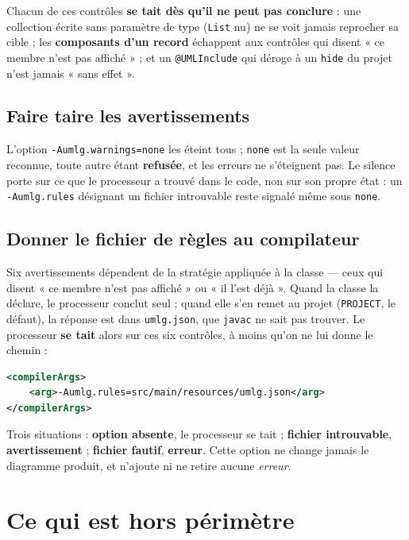 \documentclass[12pt, a4paper]{article}
\begin{document}
Chacun de ces contrôles \textbf{se tait dès qu'il ne peut pas conclure} : une collection écrite sans paramètre de type (\texttt{List} nu) ne se voit jamais reprocher sa cible ; les \textbf{composants d'un record} échappent aux contrôles qui disent « ce membre n'est pas affiché » ; et un \texttt{@UMLInclude} qui déroge à un \texttt{hide} du projet n'est jamais « sans effet ».

\subsection{Faire taire les avertissements}
L'option \texttt{-Aumlg.warnings=none} les éteint tous ; \texttt{none} est la seule valeur reconnue, toute autre étant \textbf{refusée}, et les erreurs ne s'éteignent pas. Le silence porte sur ce que le processeur a trouvé dans le code, non sur son propre état : un \texttt{-Aumlg.rules} désignant un fichier introuvable reste signalé même sous \texttt{none}.

\subsection{Donner le fichier de règles au compilateur}
\label{sec:option-regles}
Six avertissements dépendent de la stratégie appliquée à la classe --- ceux qui disent « ce membre n'est pas affiché » ou « il l'est déjà ». Quand la classe la déclare, le processeur conclut seul ; quand elle s'en remet au projet (\texttt{PROJECT}, le défaut), la réponse est dans \texttt{umlg.json}, que \texttt{javac} ne sait pas trouver. Le processeur \textbf{se tait} alors sur ces six contrôles, à moins qu'on ne lui donne le chemin :

\begin{lstlisting}[language=XML]
<compilerArgs>
    <arg>-Aumlg.rules=src/main/resources/umlg.json</arg>
</compilerArgs>
\end{lstlisting}

Trois situations : \textbf{option absente}, le processeur se tait ; \textbf{fichier introuvable}, \textbf{avertissement} ; \textbf{fichier fautif}, \textbf{erreur}. Cette option ne change jamais le diagramme produit, et n'ajoute ni ne retire aucune \textit{erreur}.

\section{Ce qui est hors périmètre}
\label{sec:horsperimetre}
\end{document}
